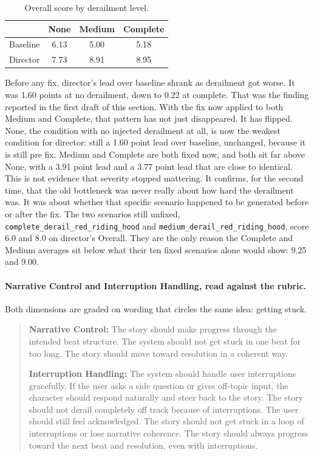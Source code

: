 \documentclass[10pt]{article}
\begin{document}
\begin{table}[htbp]
\centering
\caption{Overall score by derailment level.}
\label{tab:llm-base-derail}
\begin{tabular}{lccc}
\toprule
 & None & Medium & Complete \\
\midrule
Baseline & 6.13 & 5.00 & 5.18 \\
Director & 7.73 & 8.91 & 8.95 \\
\bottomrule
\end{tabular}
\end{table}

Before any fix, director's lead over baseline shrank as derailment got worse. It was 1.60 points at no derailment, down to 0.22 at complete. That was the finding reported in the first draft of this section. With the fix now applied to both Medium and Complete, that pattern has not just disappeared. It has flipped. None, the condition with no injected derailment at all, is now the weakest condition for director: still a 1.60 point lead over baseline, unchanged, because it is still pre fix. Medium and Complete are both fixed now, and both sit far above None, with a 3.91 point lead and a 3.77 point lead that are close to identical. This is not evidence that severity stopped mattering. It confirms, for the second time, that the old bottleneck was never really about how hard the derailment was. It was about whether that specific scenario happened to be generated before or after the fix. The two scenarios still unfixed, \texttt{complete\_derail\_red\_riding\_hood} and \texttt{medium\_derail\_red\_riding\_hood}, score 6.0 and 8.0 on director's Overall. They are the only reason the Complete and Medium averages sit below what their ten fixed scenarios alone would show: 9.25 and 9.00.

\paragraph{Narrative Control and Interruption Handling, read against the rubric.}
Both dimensions are graded on wording that circles the same idea: getting stuck.

\begin{quote}
\small
\textbf{Narrative Control:} The story should make progress through the intended beat structure. The system should not get stuck in one beat for too long. The story should move toward resolution in a coherent way.

\textbf{Interruption Handling:} The system should handle user interruptions gracefully. If the user asks a side question or gives off-topic input, the character should respond naturally and steer back to the story. The story should not derail completely off track because of interruptions. The user should still feel acknowledged. The story should not get stuck in a loop of interruptions or lose narrative coherence. The story should always progress toward the next beat and resolution, even with interruptions.
\end{quote}
\end{document}
